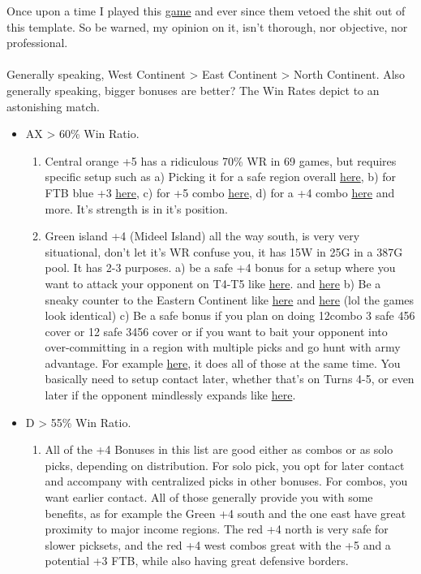 Once upon a time I played this \href{https://www.warzone.com/MultiPlayer?GameID=38090471}{game} and ever since them vetoed the shit out of this template. So be warned, my opinion on it, isn't thorough, nor objective, nor professional.
\\
\\
Generally speaking, West Continent > East Continent > North Continent. Also generally speaking, bigger bonuses are better? The Win Rates depict to an astonishing match.
\begin{itemize}
    \item AX > 60\% Win Ratio.
    \begin{enumerate}
        \item Central orange +5 has a ridiculous 70\% WR in 69 games, but requires specific setup such as a) Picking it for a safe region overall \href{https://www.warzone.com/MultiPlayer?GameID=37701672}{here}, b) for FTB blue +3 \href{https://www.warzone.com/MultiPlayer?GameID=34110306}{here}, c) for +5 combo \href{https://www.warzone.com/MultiPlayer?GameID=33927948}{here}, d) for a +4 combo \href{https://www.warzone.com/MultiPlayer?GameID=29946478}{here} and more. It's strength is in it's position. 
        \item Green island +4 (Mideel Island) all the way south, is very very situational, don't let it's WR confuse you, it has 15W in 25G in a 387G pool. It has 2-3 purposes. a) be a safe +4 bonus for a setup where you want to attack your opponent on T4-T5 like \href{https://www.warzone.com/MultiPlayer?GameID=38755207}{here}. and \href{https://www.warzone.com/MultiPlayer?GameID=32885604}{here} b) Be a sneaky counter to the Eastern Continent like \href{https://www.warzone.com/MultiPlayer?GameID=33185191}{here} and \href{https://www.warzone.com/MultiPlayer?GameID=29832639}{here} (lol the games look identical) c) Be a safe bonus if you plan on doing 12combo 3 safe 456 cover or 12 safe 3456 cover or if you want to bait your opponent into over-committing in a region with multiple picks and go hunt with army advantage. For example \href{https://www.warzone.com/MultiPlayer?GameID=37715740}{here}, it does all of those at the same time. You basically need to setup contact later, whether that's on Turns 4-5, or even later if the opponent mindlessly expands like \href{https://www.warzone.com/MultiPlayer?GameID=28354694}{here}.
    \end{enumerate}
    \item D > 55\% Win Ratio.
    \begin{enumerate}
        \item All of the +4 Bonuses in this list are good either as combos or as solo picks, depending on distribution. For solo pick, you opt for later contact and accompany with centralized picks in other bonuses. For combos, you want earlier contact. All of those generally provide you with some benefits, as for example the Green +4 south and the one east have great proximity to major income regions. The red +4 north is very safe for slower picksets, and the red +4 west combos great with the +5 and a potential +3 FTB, while also having great defensive borders.

\end{enumerate}
\end{itemize}
